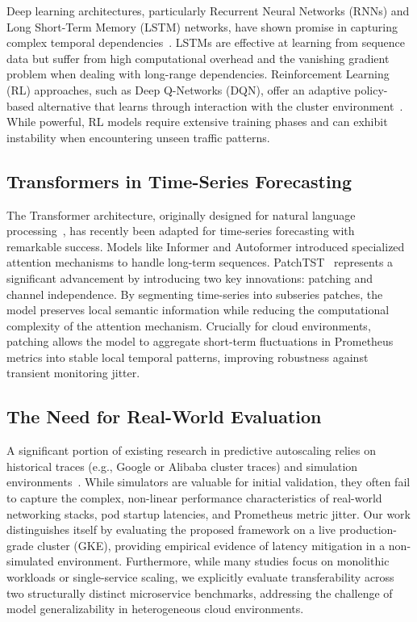 \documentclass[conference]{IEEEtran}
\begin{document}
Deep learning architectures, particularly Recurrent Neural Networks (RNNs) and Long Short-Term Memory (LSTM) networks, have shown promise in capturing complex temporal dependencies~\cite{imdoukh2020machine}. LSTMs are effective at learning from sequence data but suffer from high computational overhead and the vanishing gradient problem when dealing with long-range dependencies. Reinforcement Learning (RL) approaches, such as Deep Q-Networks (DQN), offer an adaptive policy-based alternative that learns through interaction with the cluster environment~\cite{qiu2020firm}. While powerful, RL models require extensive training phases and can exhibit instability when encountering unseen traffic patterns.

\subsection{Transformers in Time-Series Forecasting}
The Transformer architecture, originally designed for natural language processing~\cite{vaswani2017attention}, has recently been adapted for time-series forecasting with remarkable success. Models like Informer and Autoformer introduced specialized attention mechanisms to handle long-term sequences. PatchTST~\cite{nie2023patchtst} represents a significant advancement by introducing two key innovations: patching and channel independence. By segmenting time-series into subseries patches, the model preserves local semantic information while reducing the computational complexity of the attention mechanism. Crucially for cloud environments, patching allows the model to aggregate short-term fluctuations in Prometheus metrics into stable local temporal patterns, improving robustness against transient monitoring jitter.

\subsection{The Need for Real-World Evaluation}
A significant portion of existing research in predictive autoscaling relies on historical traces (e.g., Google or Alibaba cluster traces) and simulation environments~\cite{rzadca2020autopilot, yan2021hansel}. While simulators are valuable for initial validation, they often fail to capture the complex, non-linear performance characteristics of real-world networking stacks, pod startup latencies, and Prometheus metric jitter. Our work distinguishes itself by evaluating the proposed framework on a live production-grade cluster (GKE), providing empirical evidence of latency mitigation in a non-simulated environment. Furthermore, while many studies focus on monolithic workloads or single-service scaling, we explicitly evaluate transferability across two structurally distinct microservice benchmarks, addressing the challenge of model generalizability in heterogeneous cloud environments.
\end{document}
